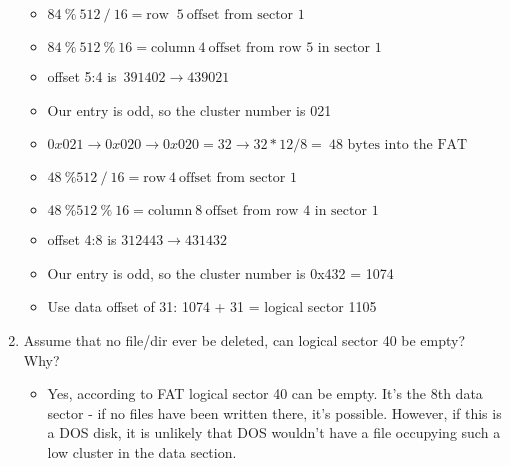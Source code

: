 \documentclass{article}
\begin{document}
\begin{enumerate}
\begin{itemize}
            \item $84~\%~512~/~16 = \text{row }~5~\text{offset from sector 1}$
            \item $84~\%~512~\%~16 = \text{column}~4~\text{offset from row 5 in sector 1}$
            \item offset 5:4 is~$39 14 02 \rightarrow 439 021$
            \item Our entry is odd, so the cluster number is 021
            \item $0x021 \rightarrow 0x020 \rightarrow 0x020 = 32 \rightarrow 32 * 12 / 8 =~\text{48 bytes into the FAT}$
            \item $48~\% 512~/~16 = \text{row}~4~\text{offset from sector 1}$
            \item $48~\% 512~\%~16 = \text{column}~8~\text{offset from row 4 in sector 1}$
            \item offset 4:8 is $31 24 43 \rightarrow 431 432$
            \item Our entry is odd, so the cluster number is 0x432 = 1074
            \item Use data offset of 31: 1074 + 31 = logical sector 1105
        \end{itemize}
        \item Assume that no file/dir ever be deleted, can logical sector 40 be empty? Why?
        \begin{itemize}
            \item Yes, according to FAT logical sector 40 can be empty. It's the 8th data sector - if no files have been written there, it's possible. However, if this is a DOS disk, it is unlikely that DOS wouldn't have a file occupying such a low cluster in the data section.
        \end{itemize}



    \end{enumerate}
\end{document}
